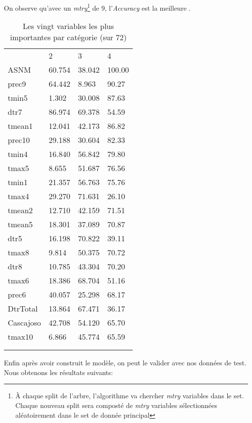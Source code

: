 \noindent On observe qu'avec un \textit{mtry}\footnote{À chaque split de l'arbre, l'algorithme va chercher \textit{mtry} variables dans le set. Chaque nouveau split sera composté de \textit{mtry} variables sélectionnées aléatoirement dans le set de donnée principal} de 9, l'\textit{Accuracy} est la meilleure .


\begin{table}[H]
	\centering
	\caption{Les vingt variables les plus importantes par catégorie (sur 72)}
	\label{RF_Class_Impvar}
	\begin{tabular}{llll}
		& 2      & 3      & 4      \\
		ASNM      & 60.754 & 38.042 & 100.00 \\
		prec9     & 64.442 & 8.963  & 90.27  \\
		tmin5     & 1.302  & 30.008 & 87.63  \\
		dtr7      & 86.974 & 69.378 & 54.59  \\
		tmean1    & 12.041 & 42.173 & 86.82  \\
		prec10    & 29.188 & 30.604 & 82.33  \\
		tmin4     & 16.840 & 56.842 & 79.80  \\
		tmax5     & 8.655  & 51.687 & 76.56  \\
		tmin1     & 21.357 & 56.763 & 75.76  \\
		tmax4     & 29.270 & 71.631 & 26.10  \\
		tmean2    & 12.710 & 42.159 & 71.51  \\
		tmean5    & 18.301 & 37.089 & 70.87  \\
		dtr5      & 16.198 & 70.822 & 39.11  \\
		tmax8     & 9.814  & 50.375 & 70.72  \\
		dtr8      & 10.785 & 43.304 & 70.20  \\
		tmax6     & 18.386 & 68.704 & 51.16  \\
		prec6     & 40.057 & 25.298 & 68.17  \\
		DtrTotal  & 13.864 & 67.471 & 36.17  \\
		Cascajoso & 42.708 & 54.120 & 65.70  \\
		tmax10    & 6.866  & 45.774 & 65.59  \\
		&        &        &        \\
		&        &        &       
	\end{tabular}
\end{table}

\noindent Enfin après avoir construit le modèle, on peut le valider avec nos données de test. Nous obtenons les résultats suivants: 


